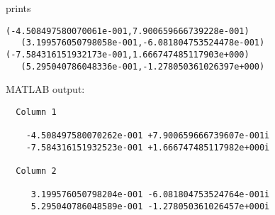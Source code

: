 prints
\begin{Verbatim}
(-4.508497580070061e-001,7.900659666739228e-001)
   (3.199576050798058e-001,-6.081804753524478e-001)
(-7.584316151932173e-001,1.666747485117903e+000)
   (5.295040786048336e-001,-1.278050361026397e+000)
\end{Verbatim}
MATLAB output:
\begin{Verbatim}
  Column 1

    -4.508497580070262e-001 +7.900659666739607e-001i
    -7.584316151932523e-001 +1.666747485117982e+000i

  Column 2

     3.199576050798204e-001 -6.081804753524764e-001i
     5.295040786048589e-001 -1.278050361026457e+000i
\end{Verbatim}
\newpage





